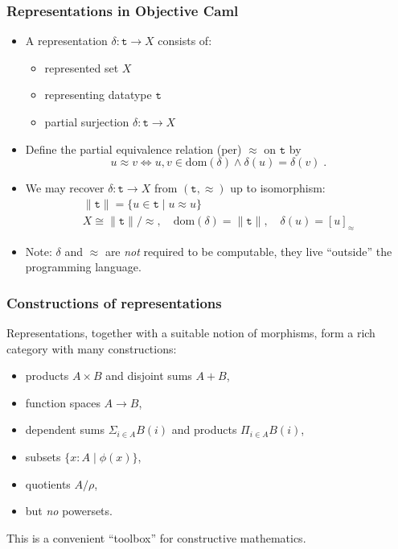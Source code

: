 \documentclass[t]{beamer}
\newcommand{\per}{\approx}
\newcommand{\dom}[1]{\mathrm{dom}(#1)}
\begin{document}
\begin{frame}
  \frametitle{Representations in Objective Caml}

  \begin{itemize}
  \item A representation $\delta: \mathtt{t} \to X$ consists of:
    \begin{itemize}[<.->]
    \item represented set $X$
    \item representing datatype $\mathtt{t}$
    \item partial surjection $\delta : \mathtt{t} \to X$
    \end{itemize}
  \item 
    Define the partial equivalence relation (per) $\per$ on
    $\mathtt{t}$ by
    \begin{equation*}
      u \per v \iff u, v \in \dom{\delta} \land \delta(u) = \delta(v) \;.
    \end{equation*}
  \item 
    We may recover $\delta : \mathtt{t} \to X $ from $(\mathtt{t},
    \per)$ up to isomorphism:
    \begin{gather*}
      \|\mathtt{t}\| = \{ u \in \mathtt{t} \mid u \per u \}
      \\
      X \cong \|\mathtt{t}\|/{\per}, \quad \dom{\delta} =
      \|\mathtt{t}\|, \quad \delta(u) = [u]_{\per}
    \end{gather*}
  \item Note: $\delta$ and $\per$ are \emph{not} required to be
    computable, they live ``outside'' the programming language.
  \end{itemize}
\end{frame}

\begin{frame}
  \frametitle{Constructions of representations}

  Representations, together with a suitable notion of morphisms, form a
  rich category with many constructions:
  \begin{itemize}[<.->]
  \item products $A \times B$ and disjoint sums $A + B$,
  \item function spaces $A \to B$,
  \item dependent sums $\Sigma_{i \in A} B(i)$ and products $\Pi_{i
      \in A} B(i)$,
  \item subsets $\{x : A \mid \phi(x)\}$,
  \item quotients $A/{\rho}$,
  \item but \emph{no} powersets.
  \end{itemize}
  This is a convenient ``toolbox'' for constructive mathematics.

\end{frame}
\end{document}
